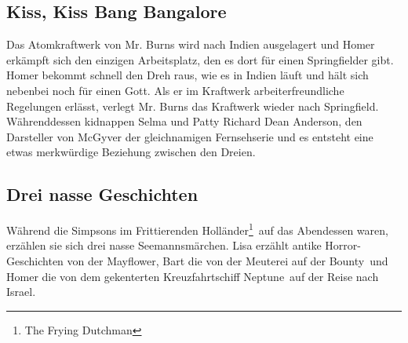 \subsection{Kiss, Kiss Bang Bangalore}\label{HABF10}
Das Atomkraftwerk von Mr. Burns wird nach Indien ausgelagert und Homer erkämpft sich den einzigen Arbeitsplatz, den es dort für einen Springfielder gibt. Homer bekommt schnell den Dreh raus, wie es in Indien läuft und hält sich nebenbei noch für einen Gott. Als er im Kraftwerk arbeiterfreundliche Regelungen erlässt, verlegt Mr. Burns das Kraftwerk wieder nach Springfield. Währenddessen kidnappen Selma und Patty Richard Dean Anderson, den Darsteller von McGyver der gleichnamigen Fernsehserie und es entsteht eine etwas merkwürdige Beziehung zwischen den Dreien.


\subsection{Drei nasse Geschichten}
Während die Simpsons im \glqq Frittierenden Holländer\footnote{The Frying Dutchman}\grqq\ auf das Abendessen waren, erzählen sie sich drei nasse Seemannsmärchen. Lisa erzählt antike Horror-Geschichten von der \glqq Mayflower\grqq , Bart die von der Meuterei auf der \glqq Bounty\grqq\ und Homer die von dem gekenterten Kreuzfahrtschiff \glqq Neptune\grqq\ auf der Reise nach Israel.





